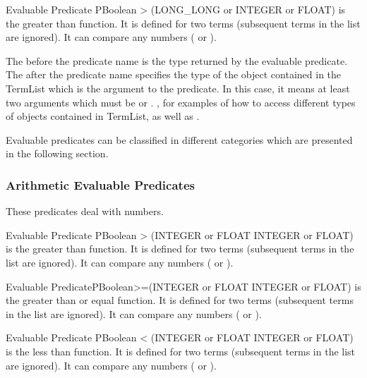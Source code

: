 \begin{typeep}{Evaluable Predicate} {PBoolean} {>} {(LONG_LONG or INTEGER or FLOAT)}
is the greater than function. It is defined for two terms (subsequent
terms in the list are ignored). It can compare any numbers ( or
).
\end{typeep}

The  before the predicate name \code{>} is the type returned
by the evaluable predicate.  The 
after the predicate name specifies the type of the object contained in the
TermList which is the argument to the \code{>} predicate. In this case, it
means at least two arguments which must be  or 
.  , for examples of how to access
different types of objects contained in TermList, as well as .

Evaluable predicates can be classified in different categories which are
presented in the following section.



\subsubsection{Arithmetic Evaluable Predicates}

These predicates deal with numbers.

\begin{typeep}{Evaluable Predicate} {PBoolean} {>} {(INTEGER or FLOAT INTEGER or FLOAT)}
is the greater than function. It is defined for two terms (subsequent
terms in the list are ignored). It can compare any numbers ( or
).
\end{typeep}

\begin{typeep}{Evaluable Predicate}{PBoolean}{>=}{(INTEGER or FLOAT INTEGER or FLOAT)}
is the greater than or equal function. It is defined for two terms
(subsequent terms in the list are ignored). It can compare any numbers
( or ).
\end{typeep}

\begin{typeep}{Evaluable Predicate} {PBoolean} {<} {(INTEGER or FLOAT INTEGER or FLOAT)}
is the less than function. It is defined for two terms (subsequent terms
in the list are ignored). It can compare any numbers ( or ).
\end{typeep}

